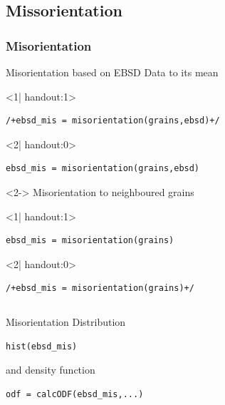 \subsection*{Missorientation}

\begin{frame}[fragile]
  \frametitle{Misorientation}


Misorientation based on EBSD Data to its mean

\begin{onlyenv}<1| handout:1>
\begin{lstlisting}
/+ebsd_mis = misorientation(grains,ebsd)+/
\end{lstlisting}
\end{onlyenv}
\begin{onlyenv}<2| handout:0>
\begin{lstlisting}
ebsd_mis = misorientation(grains,ebsd)
\end{lstlisting}
\end{onlyenv}

\begin{uncoverenv}<2->
\medskip
Misorientation to neighboured grains
\begin{onlyenv}<1| handout:1>
\begin{lstlisting}
ebsd_mis = misorientation(grains)
\end{lstlisting}
\end{onlyenv}
\begin{onlyenv}<2| handout:0>
\begin{lstlisting}
/+ebsd_mis = misorientation(grains)+/
\end{lstlisting}
\end{onlyenv}

\end{uncoverenv}

\begin{columns}[t]
\begin{column}[T]{6.25cm}
\medskip
Misorientation Distribution
\begin{lstlisting}
hist(ebsd_mis)
\end{lstlisting}

and density function
\begin{lstlisting}
odf = calcODF(ebsd_mis,...)
\end{lstlisting}


\end{column}
\end{columns}
\end{frame}
